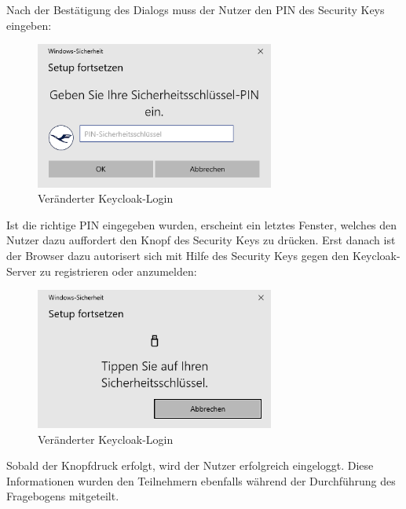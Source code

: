 Nach der Bestätigung des Dialogs muss der Nutzer den PIN des Security Keys eingeben:

\begin{figure}[H]
	\centering 
	\includegraphics[width=0.7\textwidth]{img/abbildungen/reg003.png}
	\captionsetup{format=hang}
	\caption{Veränderter Keycloak-Login}
\end{figure}

Ist die richtige PIN eingegeben wurden, erscheint ein letztes Fenster, welches den Nutzer dazu auffordert den Knopf des Security Keys zu drücken. Erst danach ist der Browser dazu autorisert sich mit Hilfe des Security Keys gegen den Keycloak-Server zu registrieren oder anzumelden:

\begin{figure}[h]
	\centering 
	\includegraphics[width=0.7\textwidth]{img/abbildungen/reg004.png}
	\captionsetup{format=hang}
	\caption{Veränderter Keycloak-Login}
\end{figure}

Sobald der Knopfdruck erfolgt, wird der Nutzer erfolgreich eingeloggt. Diese Informationen wurden den Teilnehmern ebenfalls während der Durchführung des Fragebogens mitgeteilt. 


